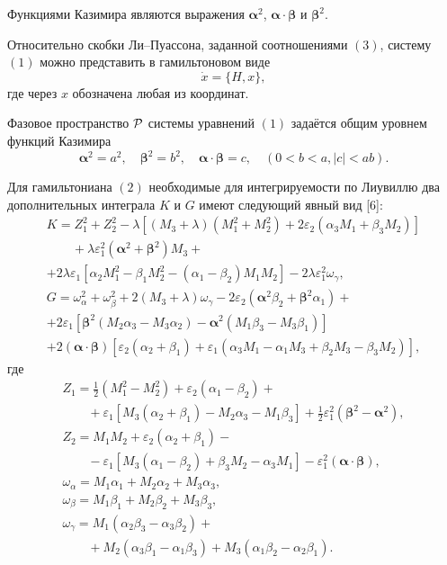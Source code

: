 Функциями Казимира являются выражения ${\boldsymbol\alpha}^2$,
${\boldsymbol\alpha}\cdot{\boldsymbol\beta}$ и ${\boldsymbol\beta}^2$.

Относительно
скобки Ли--Пуассона, заданной соотношениями $(3)$, систему $(1)$ можно
представить в гамильтоновом виде
\begin{equation*}
\dot x=\{H,x\},
\end{equation*}
где через $x$ обозначена любая из координат.

Фазовое пространство $\cal P$ системы уравнений $(1)$ задаётся общим уровнем функций Казимира
\begin{equation*}
\boldsymbol\alpha^2=a^2,\quad \boldsymbol\beta^2=b^2,\quad
{\boldsymbol\alpha}\cdot{\boldsymbol\beta}=c, \quad (0<b<a, |c|<ab).
\end{equation*}

Для гамильтониана $(2)$ необходимые для интегрируемости по Лиувиллю два дополнительных интеграла $K$ и $G$ имеют следующий явный вид [6]:
\begin{equation*}
\begin{array}{l}
K=Z_1^2+Z_2^2-\lambda[(M_3+\lambda)(M_1^2+M_2^2)+2\varepsilon_2(\alpha_3M_1+\beta_3M_2)]\\[3mm]
\qquad+\lambda\varepsilon_1^2({\boldsymbol\alpha}^2+{\boldsymbol\beta}^2)M_3+\\[3mm]
+2\lambda\varepsilon_1[\alpha_2M_1^2-\beta_1M_2^2-(\alpha_1-\beta_2)M_1M_2]
-2\lambda\varepsilon_1^2\omega_\gamma,\\[5mm]
G=\omega_\alpha^2+\omega_\beta^2+2(M_3+\lambda)\omega_\gamma-
2\varepsilon_2({\boldsymbol\alpha}^2\beta_2+{\boldsymbol\beta}^2\alpha_1)+\\[3mm]
+2\varepsilon_1[{\boldsymbol\beta}^2(M_2\alpha_3-M_3\alpha_2)-
{\boldsymbol\alpha}^2(M_1\beta_3-M_3\beta_1)]\\[3mm]
+2({\boldsymbol\alpha}\cdot{\boldsymbol\beta})[\varepsilon_2(\alpha_2+\beta_1)+\varepsilon_1(\alpha_3M_1-\alpha_1M_3+\beta_2M_3-\beta_3M_2)],
\end{array}
\end{equation*}
где
\begin{equation*}
\begin{array}{l}
Z_1=\frac{1}{2}(M_1^2-M_2^2)+\varepsilon_2(\alpha_1-\beta_2)+\\[3mm]
\qquad+\varepsilon_1[M_3(\alpha_2+\beta_1)-M_2\alpha_3-M_1\beta_3]+
\frac{1}{2}\varepsilon_1^2({\boldsymbol\beta}^2-{\boldsymbol\alpha}^2),\\[3mm]
Z_2=M_1M_2+\varepsilon_2(\alpha_2+\beta_1)-\\[3mm]
\qquad-\varepsilon_1[M_3(\alpha_1-\beta_2)+\beta_3M_2-\alpha_3M_1]-\varepsilon_1^2(
{\boldsymbol\alpha}\cdot{\boldsymbol\beta}),\\[3mm]
\omega_\alpha=M_1\alpha_1+M_2\alpha_2+M_3\alpha_3,\\[3mm]
\omega_\beta=M_1\beta_1+M_2\beta_2+M_3\beta_3,\\[3mm]
\omega_\gamma=M_1(\alpha_2\beta_3-\alpha_3\beta_2)+\\[3mm]
\qquad +M_2(\alpha_3\beta_1-\alpha_1\beta_3)+
M_3(\alpha_1\beta_2-\alpha_2\beta_1).
\end{array}
\end{equation*}


